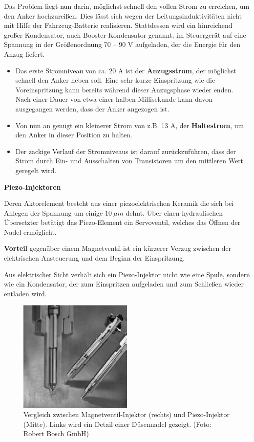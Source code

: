 Das Problem liegt nun darin, möglichst schnell den vollen Strom zu
erreichen, um den Anker hochzureißen. Dies lässt sich wegen der
Leitungsinduktivitäten nicht mit Hilfe der Fahrzeug-Batterie
realisieren. Stattdessen wird ein hinreichend großer Kondensator, auch
Booster-Kondensator genannt, im Steuergerät auf eine Spannung in der
Größenordnung 70 -- 90 V aufgeladen, der die Energie für den Anzug
liefert.

\begin{itemize}
\item
  Das erste Stromniveau von ca. 20 A ist der \textbf{Anzugsstrom}, der
  möglichst schnell den Anker heben soll. Eine sehr kurze Einspritzung
  wie die Voreinspritzung kann bereits während dieser Anzugsphase wieder
  enden. Nach einer Dauer von etwa einer halben Millisekunde kann davon
  ausgegangen werden, dass der Anker angezogen ist.
\item
  Von nun an genügt ein kleinerer Strom von z.B. 13 A, der
  \textbf{Haltestrom}, um den Anker in dieser Position zu halten.
\item
  Der zackige Verlauf der Stromniveaus ist darauf zurückzuführen, dass
  der Strom durch Ein- und Ausschalten von Transistoren um den mittleren
  Wert geregelt wird.
\end{itemize}

\textbf{Piezo-Injektoren}

Deren Aktorelement besteht aus einer piezoelektrischen Keramik die sich
bei Anlegen der Spannung um einige $10~\mu m$ dehnt. Über einen
hydraulischen Übersetzter betätigt das Piezo-Element ein Servoventil,
welches das Öffnen der Nadel ermöglicht.

\textbf{Vorteil} gegenüber einem Magnetventil ist ein kürzerer Verzug
zwischen der elektrischen Ansteuerung und dem Beginn der Einspritzung.

Aus elektrischer Sicht verhält sich ein Piezo-Injektor nicht wie eine
Spule, sondern wie ein Kondensator, der zum Einspritzen aufgeladen und
zum Schließen wieder entladen wird.

\begin{figure}[!ht]%
\centering
\includegraphics[width=0.5\textwidth]{images/EDC/EDC-9.pdf}
\caption{Vergleich zwischen Magnetventil-Injektor (rechts) und
Piezo-Injektor (Mitte). Links wird ein Detail einer Düsennadel gezeigt.
(Foto: Robert Bosch GmbH)}
\end{figure}

